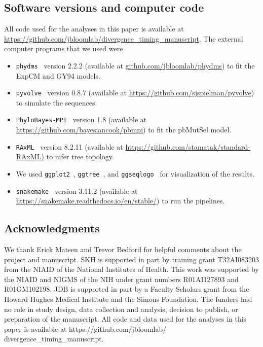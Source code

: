 \documentclass[11pt]{article}
\begin{document}
\subsection*{Software versions and computer code}
 All code used for the analyses in this paper is available at \url{https://github.com/jbloomlab/divergence_timing_manuscript}.
The external computer programs that we used were
\begin{itemize} 
\item \texttt{phydms}~\citep{hilton2017phydms} version 2.2.2 (available at \url{github.com/jbloomlab/phydms}) to fit the ExpCM and GY94 models.
\item \texttt{pyvolve}~\citep{spielman2015pyvolve} version 0.8.7 (available at \url{https://github.com/sjspielman/pyvolve}) to simulate the sequences.
\item \texttt{PhyloBayes-MPI}~\citep{rodrigue2014site} version 1.8 (available at \url{https://github.com/bayesiancook/pbmpi}) to fit the pbMutSel model. 
\item \texttt{RAxML}~\citep{stamatakis2006raxml} version 8.2.11 (available at \url{https://github.com/stamatak/standard-RAxML}) to infer tree topology.
\item We used \texttt{ggplot2}~\citep{wickham2016ggplot2}, \texttt{ggtree}~\citep{yu2017ggtree}, and \texttt{ggseqlogo}~\citep{wagih2017ggseqlogo} for visualization of the results.
\item \texttt{snakemake}~\citep{koster2012snakemake} version 3.11.2 (available at \url{https://snakemake.readthedocs.io/en/stable/}) to run the pipelines.
\end{itemize}

\subsection*{Acknowledgments}
We thank Erick Matsen and Trevor Bedford for helpful comments about the project and manuscript.
SKH is supported in part by training grant T32AI083203 from the NIAID of the National Institutes of Health.
This work was supported by the NIAID and NIGMS of the NIH under grant numbers R01AI127893 and R01GM102198. 
JDB is supported in part by a Faculty Scholars grant from the Howard Hughes Medical Institute and the Simons Foundation.
The funders had no role in study design, data collection and analysis, decision to publish, or preparation of the manuscript.
All code and data used for the analyses in this paper is available at https://github.com/jbloomlab/ divergence_timing_manuscript.
\end{document}

